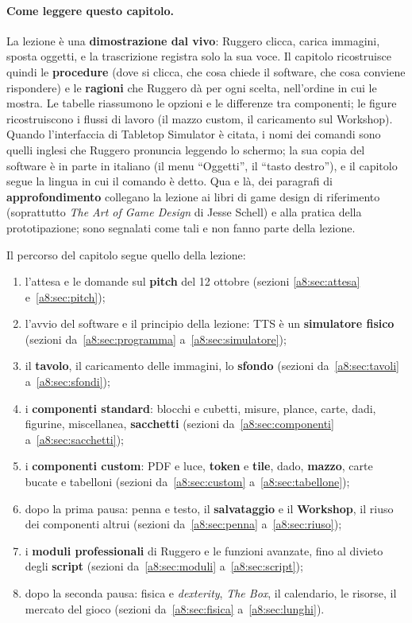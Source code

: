 \paragraph{Come leggere questo capitolo.} La lezione è una \textbf{dimostrazione dal
vivo}: Ruggero clicca, carica immagini, sposta oggetti, e la trascrizione registra
solo la sua voce. Il capitolo ricostruisce quindi le \textbf{procedure} (dove si
clicca, che cosa chiede il software, che cosa conviene rispondere) e le
\textbf{ragioni} che Ruggero dà per ogni scelta, nell'ordine in cui le mostra. Le
tabelle riassumono le opzioni e le differenze tra componenti; le figure
ricostruiscono i flussi di lavoro (il mazzo custom, il caricamento sul Workshop).
Quando l'interfaccia di Tabletop Simulator è citata, i nomi dei comandi sono quelli
inglesi che Ruggero pronuncia leggendo lo schermo; la sua copia del software è in
parte in italiano (il menu ``Oggetti'', il ``tasto destro''), e il capitolo segue la
lingua in cui il comando è detto. Qua e là, dei paragrafi di
\textbf{approfondimento} collegano la lezione ai libri di game design di riferimento
(soprattutto \emph{The Art of Game Design} di Jesse Schell) e alla pratica della
prototipazione; sono segnalati come tali e non fanno parte della lezione.

Il percorso del capitolo segue quello della lezione:
\begin{enumerate}
  \item l'attesa e le domande sul \textbf{pitch} del 12 ottobre (sezioni
        \ref{a8:sec:attesa} e~\ref{a8:sec:pitch});
  \item l'avvio del software e il principio della lezione: TTS è un
        \textbf{simulatore fisico} (sezioni da~\ref{a8:sec:programma}
        a~\ref{a8:sec:simulatore});
  \item il \textbf{tavolo}, il caricamento delle immagini, lo \textbf{sfondo}
        (sezioni da~\ref{a8:sec:tavoli} a~\ref{a8:sec:sfondi});
  \item i \textbf{componenti standard}: blocchi e cubetti, misure, plance, carte,
        dadi, figurine, miscellanea, \textbf{sacchetti} (sezioni
        da~\ref{a8:sec:componenti} a~\ref{a8:sec:sacchetti});
  \item i \textbf{componenti custom}: PDF e luce, \textbf{token} e \textbf{tile},
        dado, \textbf{mazzo}, carte bucate e tabelloni (sezioni
        da~\ref{a8:sec:custom} a~\ref{a8:sec:tabellone});
  \item dopo la prima pausa: penna e testo, il \textbf{salvataggio} e il
        \textbf{Workshop}, il riuso dei componenti altrui (sezioni
        da~\ref{a8:sec:penna} a~\ref{a8:sec:riuso});
  \item i \textbf{moduli professionali} di Ruggero e le funzioni avanzate, fino al
        divieto degli \textbf{script} (sezioni da~\ref{a8:sec:moduli}
        a~\ref{a8:sec:script});
  \item dopo la seconda pausa: fisica e \emph{dexterity}, \emph{The Box}, il
        calendario, le risorse, il mercato del gioco (sezioni
        da~\ref{a8:sec:fisica} a~\ref{a8:sec:lunghi}).
\end{enumerate}

